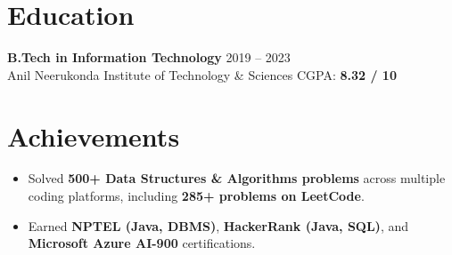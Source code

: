 \documentclass[10pt,a4paper]{article}
\begin{document}
\section*{Education}
\textbf{B.Tech in Information Technology} \hfill 2019 -- 2023 \\
Anil Neerukonda Institute of Technology \& Sciences \hfill CGPA: \textbf{8.32 / 10}

\section*{Achievements}
\begin{itemize}
    \item Solved \textbf{500+ Data Structures \& Algorithms problems} across multiple coding platforms, including \textbf{285+ problems on LeetCode}.
    \item Earned \textbf{NPTEL (Java, DBMS)}, \textbf{HackerRank (Java, SQL)}, and \textbf{Microsoft Azure AI-900} certifications.
\end{itemize}
\end{document}
